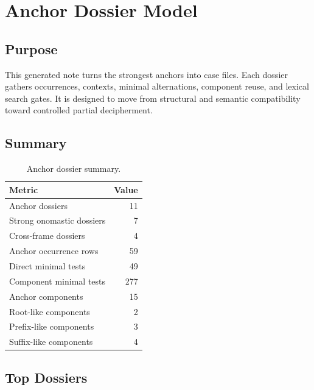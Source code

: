 \section{Anchor Dossier Model}

\subsection{Purpose}

This generated note turns the strongest anchors into case files. Each dossier gathers occurrences, contexts, minimal alternations, component reuse, and lexical search gates. It is designed to move from structural and semantic compatibility toward controlled partial decipherment.

\subsection{Summary}

\begin{table}[htbp]
\centering
\begin{tabular}{p{}r}
\toprule
\textbf{Metric} & \textbf{Value} \\
\midrule
Anchor dossiers & 11 \\
Strong onomastic dossiers & 7 \\
Cross-frame dossiers & 4 \\
Anchor occurrence rows & 59 \\
Direct minimal tests & 49 \\
Component minimal tests & 277 \\
Anchor components & 15 \\
Root-like components & 2 \\
Prefix-like components & 3 \\
Suffix-like components & 4 \\
\bottomrule
\end{tabular}
\caption{Anchor dossier summary.}
\end{table}

\subsection{Top Dossiers}

